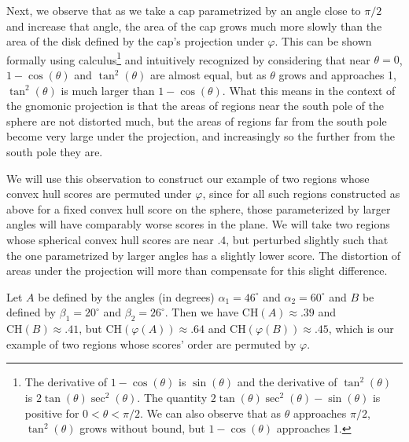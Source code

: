 {\begin{example}
  Next, we observe that as we take a cap parametrized by an angle close
  to $\pi/2$ and increase that angle, the area of the cap grows much
  more slowly than the area of the disk defined by the cap's projection
  under $\varphi$.  This can be shown formally using
  calculus\footnote{The derivative of $1-\cos(\theta)$ is $\sin(\theta)$
  and the derivative of $\tan^2(\theta)$ is
  $2\tan(\theta)\sec^2(\theta)$.  The quantity
  $2\tan(\theta)\sec^2(\theta)-\sin(\theta)$ is positive for
  $0<\theta<\pi/2$.  We can also observe that as $\theta$ approaches
  $\pi/2$, $\tan^2(\theta)$ grows without bound, but $1-\cos(\theta)$
  approaches 1.} and intuitively recognized by considering that near
  $\theta=0$, $1-\cos(\theta)$ and $\tan^2(\theta)$ are almost equal,
  but as $\theta$ grows and approaches 1, $\tan^2(\theta)$ is much
  larger than $1-\cos(\theta)$.  What this means in the context of the
  gnomonic projection is that the areas of regions near the south pole
  of the sphere are not distorted much, but the areas of regions far
  from the south pole become very large under the projection, and
  increasingly so the further from the south pole they are. 

  We will use this observation to construct our example of two regions
  whose convex hull scores are permuted under $\varphi$, since for all
  such regions constructed as above for a fixed convex hull score on the
  sphere, those parameterized by larger angles will have comparably
  worse scores in the plane.  We will take two regions whose spherical
  convex hull scores are near $.4$, but perturbed slightly such that the
  one parametrized by larger angles has a slightly lower score.  The
  distortion of areas under the projection will more than compensate for
  this slight difference.


  Let $A$ be defined by the angles (in degrees) $\alpha_1=46^\circ$ and
  $\alpha_2=60^\circ$ and $B$ be defined by $\beta_1=20^\circ$ and
  $\beta_2=26^\circ$.  Then we have $\mathrm{CH}(A)\approx .39$ and
  $\mathrm{CH}(B)\approx .41$, but $\mathrm{CH}(\varphi(A))\approx .64$
  and $\mathrm{CH}(\varphi(B))\approx .45$, which is our example of two
  regions whose scores' order are permuted by $\varphi$.
\end{example}}


